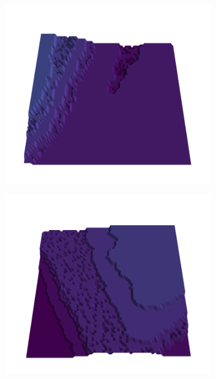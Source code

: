 \begin{figure}[H]
    \begin{subfigure}[b]{0.19\textwidth}
        \includegraphics[width=\linewidth]{../img/5/quarry/best//patch-3d-majavi-colormap-2.png}
    \end{subfigure}
    \begin{subfigure}[b]{0.19\textwidth}
        \includegraphics[width=\linewidth]{../img/5/quarry/best//patch-3d-majavi-colormap-3.png}
    \end{subfigure}  

\end{figure}
